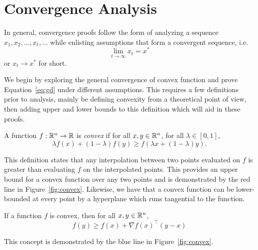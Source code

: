 \section{Convergence Analysis}

In general, convergence proofs follow the form of analyzing a sequence $x_1,
x_2, \dots, x_t, \dots$ while enlisting assumptions that form a convergent
sequence, i.e.
\begin{equation}
    \lim_{t \rightarrow \infty} x_t = x^* 
\end{equation} or $x_t \rightarrow x^*$ for short.

We begin by exploring the general convergence of convex function and prove
Equation~\ref{eq:gd} under different assumptions.  This requires a few
definitions prior to analysis, mainly be defining convexity from a theoretical
point of view, then adding upper and lower bounds to this definition which will
aid in these proofs. 

\begin{definition}
    A function $f: \mathbb R^n \rightarrow \mathbb R$ is \emph{convex} if for all $x, y \in
    \mathbb R^n$, for all $\lambda \in [0, 1]$,
    \begin{equation}
        \lambda f(x) + (1 - \lambda)f(y) \geq f(\lambda x + (1 - \lambda)y).
    \end{equation}
\end{definition}

This definition states that any interpolation between two points
evaluated on $f$ is greater than evaluating $f$ on the interpolated points. This
provides an upper bound for a convex function over any two points and is
demonstrated by the red line in Figure~\ref{fig:convex}. Likewise, we
have that a convex function can be lower-bounded at every point by a hyperplane
which runs tangential to the function.

\begin{lemma}
    \label{lem:convex_bound}
    If a function $f$ is convex, then for all $x, y \in \mathbb R^n$,
    \begin{equation}
        f(y) \geq f(x) + \nabla {f(x)}^\intercal (y - x)
    \end{equation}
\end{lemma}

This concept is demonstrated by the blue line in Figure~\ref{fig:convex}. 

